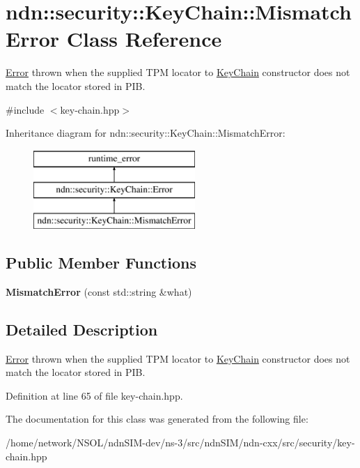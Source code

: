 \hypertarget{classndn_1_1security_1_1KeyChain_1_1MismatchError}{}\section{ndn\+:\+:security\+:\+:Key\+Chain\+:\+:Mismatch\+Error Class Reference}
\label{classndn_1_1security_1_1KeyChain_1_1MismatchError}


\hyperlink{classndn_1_1security_1_1KeyChain_1_1Error}{Error} thrown when the supplied T\+PM locator to \hyperlink{classndn_1_1security_1_1KeyChain}{Key\+Chain} constructor does not match the locator stored in P\+IB.  




{\ttfamily \#include $<$key-\/chain.\+hpp$>$}

Inheritance diagram for ndn\+:\+:security\+:\+:Key\+Chain\+:\+:Mismatch\+Error\+:\begin{figure}[H]
\begin{center}
\leavevmode
\includegraphics[height=3.000000cm]{classndn_1_1security_1_1KeyChain_1_1MismatchError}
\end{center}
\end{figure}
\subsection*{Public Member Functions}
\begin{DoxyCompactItemize}
\item 
{\bfseries Mismatch\+Error} (const std\+::string \&what)\hypertarget{classndn_1_1security_1_1KeyChain_1_1MismatchError_a087886a00fe4bc6b55503340022ff184}{}\label{classndn_1_1security_1_1KeyChain_1_1MismatchError_a087886a00fe4bc6b55503340022ff184}

\end{DoxyCompactItemize}


\subsection{Detailed Description}
\hyperlink{classndn_1_1security_1_1KeyChain_1_1Error}{Error} thrown when the supplied T\+PM locator to \hyperlink{classndn_1_1security_1_1KeyChain}{Key\+Chain} constructor does not match the locator stored in P\+IB. 

Definition at line 65 of file key-\/chain.\+hpp.



The documentation for this class was generated from the following file\+:\begin{DoxyCompactItemize}
\item 
/home/network/\+N\+S\+O\+L/ndn\+S\+I\+M-\/dev/ns-\/3/src/ndn\+S\+I\+M/ndn-\/cxx/src/security/key-\/chain.\+hpp\end{DoxyCompactItemize}

